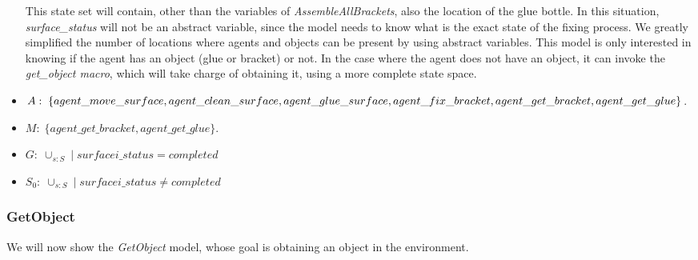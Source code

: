\begin{itemize}
		This state set will contain, other than the variables of \textit{AssembleAllBrackets}, also the location of the glue bottle. In this situation, \textit{surface\_status} will not be an abstract variable, since the model needs to know what is the exact state of the fixing process. We greatly simplified the number of locations where agents and objects can be present by using abstract variables. This model is only interested in knowing if the agent has an object (glue or bracket) or not. In the case where the agent does not have an object, it can invoke the \textit{get\_object macro}, which will take charge of obtaining it, using a more complete state space.
	\item $A:\;\{agent\_move\_surface,agent\_clean\_surface,agent\_glue\_surface,\\
	agent\_fix\_bracket,agent\_get\_bracket,agent\_get\_glue\}$.
	\item $M:\;\{agent\_get\_bracket,agent\_get\_glue\}$.
	\item $G:\; \cup_{s:S}\; |\; surfacei\_status=completed$
	\item $S_0:\; \cup_{s:S}\; |\; surfacei\_status \neq completed$
\end{itemize}


\subsubsection{GetObject}
We will now show the \textit{GetObject} model, whose goal is obtaining an object in the environment.

